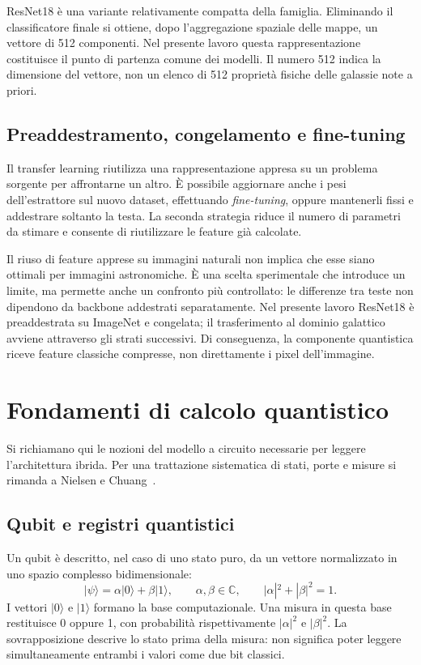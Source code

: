 ResNet18 è una variante relativamente compatta della famiglia. Eliminando
il classificatore finale si ottiene, dopo l'aggregazione spaziale delle
mappe, un vettore di 512 componenti. Nel presente lavoro questa
rappresentazione costituisce il punto di partenza comune dei modelli.
Il numero 512 indica la dimensione del vettore, non un elenco di 512
proprietà fisiche delle galassie note a priori.

\subsection{Preaddestramento, congelamento e fine-tuning}

Il transfer learning riutilizza una rappresentazione appresa su un
problema sorgente per affrontarne un altro. È possibile aggiornare
anche i pesi dell'estrattore sul nuovo dataset, effettuando
\emph{fine-tuning}, oppure mantenerli fissi e addestrare soltanto la testa.
La seconda strategia riduce il numero di parametri da stimare e consente
di riutilizzare le feature già calcolate.

Il riuso di feature apprese su immagini naturali non implica che esse
siano ottimali per immagini astronomiche. È una scelta sperimentale
che introduce un limite, ma permette anche un confronto più controllato:
le differenze tra teste non dipendono da backbone addestrati separatamente.
Nel presente lavoro ResNet18 è preaddestrata su ImageNet e congelata; il
trasferimento al dominio galattico avviene attraverso gli strati successivi.
Di conseguenza, la componente quantistica riceve feature classiche
compresse, non direttamente i pixel dell'immagine.

\section{Fondamenti di calcolo quantistico}
\label{sec:fond-quantum}

Si richiamano qui le nozioni del modello a circuito necessarie per
leggere l'architettura ibrida. Per una trattazione sistematica di stati,
porte e misure si rimanda a Nielsen e Chuang~\cite{nielsen2010quantum}.

\subsection{Qubit e registri quantistici}

Un qubit è descritto, nel caso di uno stato puro, da un vettore normalizzato
in uno spazio complesso bidimensionale:
\begin{equation}
 |\psi\rangle=\alpha|0\rangle+\beta|1\rangle,
 \qquad \alpha,\beta\in\mathbb C,
 \qquad |\alpha|^2+|\beta|^2=1.
\end{equation}
I vettori \(|0\rangle\) e \(|1\rangle\) formano la base computazionale.
Una misura in questa base restituisce 0 oppure 1, con probabilità
rispettivamente \(|\alpha|^2\) e \(|\beta|^2\). La sovrapposizione
descrive lo stato prima della misura: non significa poter leggere
simultaneamente entrambi i valori come due bit classici.

